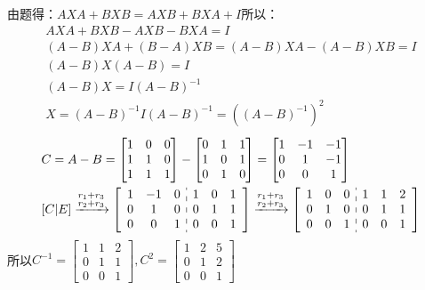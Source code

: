 \documentclass{article}
\begin{document}
\begin{jie}
由题得：$AXA+BXB=AXB+BXA+I$所以：
\begin{gather*}
  AXA+BXB-AXB-BXA=I\\
  (A-B)XA+(B-A)XB=(A-B)XA-(A-B)XB=I \\
  (A-B)X(A-B)=I\\
  (A-B)X=I(A-B)^{-1}\\
  X=(A-B)^{-1}I(A-B)^{-1}=((A-B)^{-1})^{2}
\end{gather*}
\begin{align*}
 &C=A-B=\begin{bmatrix}
  1 &  0 & 0\\
  1 & 1 & 0\\
   1 & 1 & 1
\end{bmatrix}-
\begin{bmatrix}
  0 & 1 & 1\\
  1 & 0 & 1 \\
  0 & 1 & 0
\end{bmatrix}=\begin{bmatrix}
  1 &  -1 & -1\\
  0 & 1 & -1\\
   0 & 0 & 1
\end{bmatrix}\\
&[C|E]\xrightarrow{\substack{r_{1}+r_{3}\\ r_{2}+r_{3}}}
{\left[
\begin{array}{c:c}
\begin{matrix}
 1 &  -1 & 0\\
  0 & 1 & 0\\
   0 & 0 & 1
\end{matrix} &
\begin{matrix}
  1 & 0 & 1\\
  0 & 1 & 1\\
  0 & 0 & 1
\end{matrix}
\end{array}
\right]
}\xrightarrow{\substack{r_{1}+r_{3}\\ r_{2}+r_{3}}}
{\left[
\begin{array}{c:c}
\begin{matrix}
 1 &  0 & 0\\
  0 & 1 & 0\\
   0 & 0 & 1
\end{matrix} &
\begin{matrix}
  1 & 1 & 2\\
  0 & 1 & 1\\
  0 & 0 & 1
\end{matrix}
\end{array}
\right]
}
\end{align*}
所以$C^{-1}=\begin{bmatrix}
  1 & 1 & 2\\
  0 & 1 & 1\\
  0 & 0 & 1
\end{bmatrix},C^{2}=\begin{bmatrix}
  1 & 2 & 5\\
  0 & 1 & 2\\
  0 & 0 & 1
\end{bmatrix}$
\end{jie}
\end{document}
